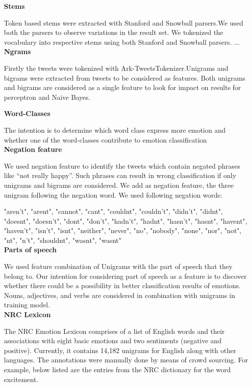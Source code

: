 \documentclass[11pt]{article}
\begin{document}
  
  {\bf Stems}
  
  
  Token based stems were extracted with Stanford and Snowball parsers.We used both the parsers to observe variations in the result set. We tokenized the vocabulary into respective stems using both Stanford and Snowball parsers.
  ...\\
  
  
  {\bf Ngrams}
  
  Firstly the tweets were tokenized with Ark-TweetsTokenizer.Unigrams and bigrams were extracted from tweets to be considered as features. Both unigrams and bigrams are considered as a single feature to look for impact on results for perceptron and Naive Bayes.
  
  
  {\bf Word-Classes}
  
  
  The intention is to determine which word class express more emotion and whether one of the word-classes contribute to emotion classification\\
  
  
  {\bf Negation feature}
  
  
  We used negation feature to identify the tweets which contain negated phrases like “not really happy”. Such phrases can result in wrong
  classification if only unigrams and bigrams are considered. We add as negation feature, the three unigram following the negation word. We used
  following negation words:
  
  "aren’t", "arent", "cannot", "cant", "couldnt", "couldn’t", "didn’t", "didnt", "doesnt", "doesn’t", "dont", "don’t", "hadn’t", "hadnt", "hasn’t",
  "hasnt", "havent", "haven’t", "isn’t", "isnt", "neither", "never", "no", "nobody", "none", "nor", "not", "nt", "n’t", "shouldnt", "wasnt", "wasnt"\\
  
  {\bf Parts of speech}
  
  
  We used feature combination of Unigrams with the part of speech that they belong to. Our intention for considering part of speech as a feature is to discover
  whether there could be a possibility in better classification results of emotions. Nouns, adjectives, and verbs are considered in combination
  with unigrams in training model. \\
  
  {\bf NRC Lexicon}
  
  The NRC Emotion Lexicon comprises of a list of English words and their associations with eight basic emotions and two sentiments (negative and
  positive). Currently, it contains 14,182 unigrams for English along with other languages. The annotations were manually done by means of crowd sourcing. For example, below listed are the entries from the NRC dictionary for the word excitement.\\
  
\end{document}
